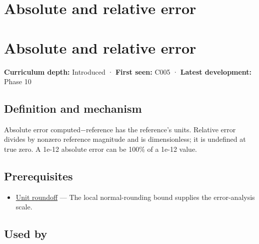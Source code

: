 \hypertarget{appendix-3ae74e89b4e6}{}
\section*{Absolute and relative error}
\section{Absolute and relative error}\label{absolute-and-relative-error}

\textbf{Curriculum depth:} Introduced · \textbf{First seen:} C005 · \textbf{Latest development:} Phase 10

\subsection{Definition and mechanism}\label{definition-and-mechanism}

Absolute error \textbar computed−reference\textbar{} has the reference's units. Relative error divides by nonzero reference magnitude and is dimensionless; it is undefined at true zero. A 1e-12 absolute error can be 100\% of a 1e-12 value.

\subsection{Prerequisites}\label{prerequisites}

\begin{itemize}
\tightlist
\item
  \hyperref[appendix-bc44f7b42f42]{Unit roundoff} --- The local normal-rounding bound supplies the error-analysis scale.
\end{itemize}

\subsection{Used by}\label{used-by}

